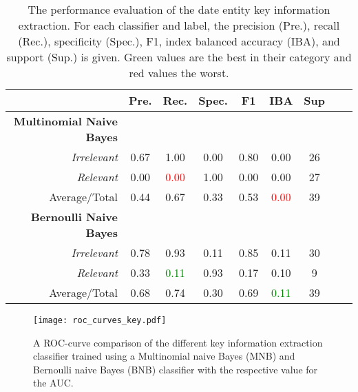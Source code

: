 \begin{table}
  \caption{The performance evaluation of the date entity key information extraction. For each classifier and label, the precision (Pre.), recall (Rec.), specificity (Spec.), F1, index balanced accuracy (IBA), and support (Sup.) is given. Green values are the best in their category and red values the worst.}
  \centering
  \begin{tabular}{@{}rcccccccc@{}}
    \toprule
     & \textbf{Pre.} & \textbf{Rec.} & \textbf{Spec.}
    & \textbf{F1} &  \textbf{IBA}& \textbf{Sup} \\
    \midrule
    \textbf{Multinomial Naive Bayes}\\
    \textsl{Irrelevant}& 0.67& 1.00&  0.00& 0.80& 0.00& 26 \\
    \textsl{Relevant}& 0.00& \textcolor{red}{0.00}&  1.00& 0.00& 0.00& 27 \\
    Average/Total& 0.44& 0.67& 0.33& 0.53& \textcolor{red}{0.00}& 39 \vspace{2mm}\\
    \textbf{Bernoulli Naive Bayes}\\
    \textsl{Irrelevant}& 0.78& 0.93&  0.11& 0.85& 0.11& 30 \\
    \textsl{Relevant}& 0.33& \textcolor{green}{0.11}&  0.93& 0.17& 0.10& 9 \\
    Average/Total& 0.68& 0.74& 0.30& 0.69& \textcolor{green}{0.11}& 39 \vspace{2mm}\\
    \bottomrule
  \end{tabular}
\label{table:keyword_performance_dates}
\end{table}

\begin{figure}
  \centering
  \texttt{[image: roc\_curves\_key.pdf]}
  \caption{A ROC-curve comparison of the different key information extraction classifier trained using a Multinomial naive Bayes (MNB) and Bernoulli naive Bayes (BNB) classifier with the respective value for the AUC.}
\label{fig:roc_key}
\end{figure}

